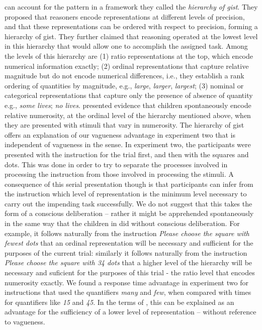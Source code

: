 \documentclass[man,floatmark]{apa}
\begin{document}
\begin{seriate}
\item {} can account for the pattern in a framework they called the \emph{hierarchy of gist}. They proposed that reasoners encode representations at different levels of precision, and that these representations can be ordered with respect to precision, forming a hierarchy of gist. They further claimed that reasoning operated at the lowest level in this hierarchy that would allow one to accomplish the assigned task. Among the levels of this hierarchy are  (1) ratio representations at the top, which encode numerical information exactly; (2) ordinal representations that capture relative magnitude but do not encode numerical differences, i.e., they establish a rank ordering of quantities by magnitude, e.g., \emph{large}, \emph{larger}, \emph{largest}; (3) nominal or categorical representations that capture only the presence of absence of quantity e.g., \emph{some lives}; \emph{no lives}.  presented evidence that children spontaneously encode relative numerosity, at the ordinal level of the hierarchy mentioned above, when they are presented with stimuli that vary in numerosity. The hierarchy of gist offers an explanation of our vagueness advantage in experiment two that is independent of vagueness in the  sense. In experiment two, the participants were presented with the instruction for the trial first, and then with the squares and dots. This was done in order to try to separate the processes involved in processing the instruction from those involved in processing the stimuli. A consequence of this serial presentation though is that participants can infer from the instruction which level of representation is the minimum level necessary to carry out the impending task successfully. We do not suggest that this takes the form of a conscious deliberation -- rather it might be apprehended spontaneously in the same way that the children in  did without conscious deliberation. For example, it follows naturally from the instruction \emph{Please choose the square with fewest dots} that an ordinal representation will be necessary and sufficient for the purposes of the current trial: similarly it follows naturally from the instruction \emph{Please choose the square with 34 dots} that a higher level of the hierarchy will be necessary and suficient for the purposes of this trial - the ratio level that encodes numerosity exactly. We found a response time advantage in experiment two for instructions that used the quantifiers \emph{many} and \emph{few}, when compared with times for quantifiers like \emph{15} and \emph{45}. In the terms of , this can be explained as an advantage for the sufficiency of a lower level of representation -- without reference to vagueness.


\end{seriate}
\end{document}
